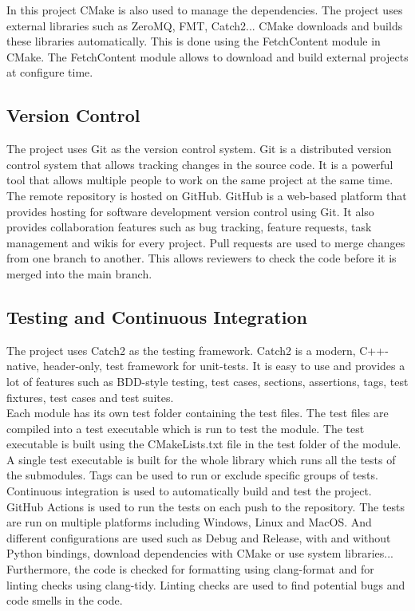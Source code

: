 \begin{spacing}{1.2}
    In this project CMake is also used to manage the dependencies. The project uses external
    libraries such as ZeroMQ, FMT, Catch2... CMake downloads and builds these libraries
    automatically. This is done using the FetchContent module in CMake. The FetchContent module
    allows to download and build external projects at configure time.

    \subsection{Version Control}
    The project uses Git as the version control system. Git is a distributed version control system
    that allows tracking changes in the source code. It is a powerful tool that allows multiple people
    to work on the same project at the same time.\\

    The remote repository is hosted on GitHub. GitHub is a web-based platform that provides
    hosting for software development version control using Git. It also provides collaboration
    features such as bug tracking, feature requests, task management and wikis for every project.
    Pull requests are used to merge changes from one branch to another. This allows reviewers
    to check the code before it is merged into the main branch.\\



    \subsection{Testing and Continuous Integration}
    The project uses Catch2 as the testing framework. Catch2 is a modern, C++-native, header-only,
    test framework for unit-tests. It is easy to use and provides a lot of features such as
    BDD-style testing, test cases, sections, assertions, tags, test fixtures, test cases
    and test suites.\\

    Each module has its own test folder containing the test files. The test files are compiled
    into a test executable which is run to test the module. The test executable is built using
    the CMakeLists.txt file in the test folder of the module. A single test executable is built
    for the whole library which runs all the tests of the submodules. Tags can be used to run or exclude
    specific groups of tests.\\

    Continuous integration is used to automatically build and test the project. GitHub Actions
    is used to run the tests on each push to the repository. The tests are run on multiple
    platforms including Windows, Linux and MacOS. And different configurations are used such
    as Debug and Release, with and without Python bindings, download dependencies with CMake or use system libraries...
    Furthermore, the code is checked for formatting using clang-format and for linting checks using clang-tidy.
    Linting checks are used to find potential bugs and code smells in the code.\\




\end{spacing}
